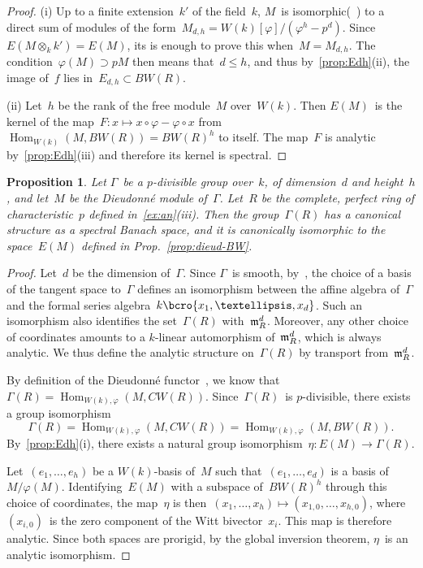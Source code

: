 \documentclass{article}
\newtheorem{prop}[thm]{Proposition}
\theoremstyle{definition}
\DeclareMathOperator\Hom{Hom}
\begin{document}
\begin{proof}
(i) Up to a finite extension~$k'$ of the field~$k$,
$M$~is isomorphic(~\cite[IV.4]{Demazure1972}) to
a direct sum of modules of the form~$M_{d,h} = W(k)[φ]/(φ^h-p^d)$.
Since $E(M ⊗_k k') = E(M)$, its is enough to prove this when~$M = M_{d,h}$.
The condition~$φ(M) ⊃ p M$ then means that~$d ≤ h$,
and thus by~\ref{prop:Edh}(ii), the image of~$f$ lies in~$E_{d,h} ⊂ BW(R)$.

(ii) 
Let~$h$ be the rank of the free module~$M$ over~$W(k)$.
Then $E(M)$~is the kernel of the map~$F: x ↦ x ∘ φ - φ ∘
x$ from~$\Hom_{W(k)} (M, BW(R)) = BW(R)^h$ to itself. The map~$F$ is
analytic by~\ref{prop:Edh}(iii) and therefore its kernel is spectral.
\end{proof}%

\begin{prop}\label{prop:EM-GammaR}
Let $Γ$~be a $p$-divisible group over~$k$, of dimension~$d$ and
height~$h$, and let~$M$ be the Dieudonné module of~$Γ$.
Let~$R$ be the complete, perfect ring of characteristic~$p$ defined
in~\ref{ex:an}(iii).
Then the group~$Γ(R)$ has a canonical structure as a
spectral Banach space, and it is canonically isomorphic to
the space~$E(M)$ defined in Prop.~\ref{prop:dieud-BW}.
\end{prop}%

\begin{proof}
Let~$d$ be the dimension of~$Γ$.
Since $Γ$~is smooth, by~\cite[II.10,II.11]{Demazure1972},
the choice of a basis of the tangent space to~$Γ$ defines an isomorphism
between the affine algebra of~$Γ$ and
the formal series algebra~$k\bcro{x_1,…,x_d}$.
Such an isomorphism also identifies the set~$Γ(R)$ with~$\mathfrak m_R^d$.
Moreover, any other choice of coordinates amounts to a $k$-linear
automorphism of~$\mathfrak m_R^d$, which is always analytic.
We thus define the analytic structure on~$Γ(R)$ by transport from~$\mathfrak m_R^d$.

By definition of the Dieudonné functor~\cite[III.1.2]{Fontaine1977},
we know that~$Γ(R) = \Hom_{W(k), φ} (M, CW(R))$.
Since~$Γ(R)$~is $p$-divisible, there exists a group isomorphism
\begin{equation}
Γ(R) = \Hom_{W(k), φ} (M, CW(R)) = \Hom_{W(k), φ} (M, BW(R)).
\end{equation}
By~\ref{prop:Edh}(i),
there exists a natural group isomorphism~$η: E(M) → Γ(R)$.

Let~$(e_1,…,e_h)$ be a $W(k)$-basis of~$M$ such that~$(e_1,…,e_d)$ is a
basis of~$M/φ(M)$. Identifying~$E(M)$ with a subspace of~$BW(R)^h$ through
this choice of coordinates, the map~$η$ is then~$(x_1,…,x_h) ↦
(x_{1,0},…,x_{h,0})$, where~$(x_{i,0})$~is the zero component of the Witt
bivector~$x_i$. This map is therefore analytic. Since both spaces are
prorigid, by the global inversion theorem, $η$~is an analytic
isomorphism.
\end{proof}%
\end{document}
